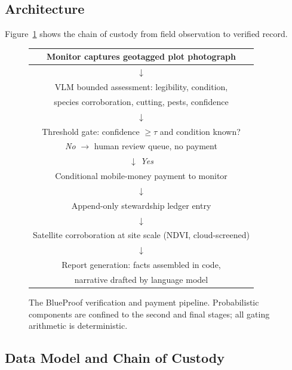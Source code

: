\documentclass[10pt,twocolumn,a4paper]{article}
\begin{document}
\subsection{Architecture}

Figure~\ref{fig:pipeline} shows the chain of custody from field observation to
verified record.

\begin{figure}[t]
\centering
\small
\begin{tabular}{@{}c@{}}
\hline
\rule{0pt}{2.4ex}Monitor captures geotagged plot photograph\\
\hline
$\downarrow$\\
\hline
\rule{0pt}{2.4ex}VLM bounded assessment: legibility, condition,\\
species corroboration, cutting, pests, confidence\\
\hline
$\downarrow$\\
\hline
\rule{0pt}{2.4ex}Threshold gate: confidence $\geq \tau$ and condition known?\\
\emph{No} $\rightarrow$ human review queue, no payment\\
\hline
$\downarrow$ \emph{Yes}\\
\hline
\rule{0pt}{2.4ex}Conditional mobile-money payment to monitor\\
\hline
$\downarrow$\\
\hline
\rule{0pt}{2.4ex}Append-only stewardship ledger entry\\
\hline
$\downarrow$\\
\hline
\rule{0pt}{2.4ex}Satellite corroboration at site scale (NDVI, cloud-screened)\\
\hline
$\downarrow$\\
\hline
\rule{0pt}{2.4ex}Report generation: facts assembled in code,\\
narrative drafted by language model\\
\hline
\end{tabular}
\caption{The BlueProof verification and payment pipeline. Probabilistic
components are confined to the second and final stages; all gating arithmetic
is deterministic.}
\label{fig:pipeline}
\end{figure}

\subsection{Data Model and Chain of Custody}
\end{document}

